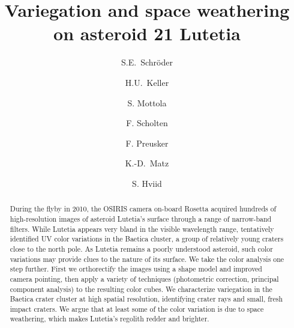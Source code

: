 \documentclass[3p,authoryear]{elsarticle}
\begin{document}
\begin{frontmatter}



\title{Variegation and space weathering on asteroid 21 Lutetia}


\author[DLR]{S.E.~Schr\"oder}
\author[TUB]{H.U.~Keller}
\author[DLR]{S. Mottola}
\author[DLR]{F. Scholten}
\author[DLR]{F. Preusker}
\author[DLR]{K.-D.~Matz}
\author[DLR]{S. Hviid}


\address[DLR]{Deutsches Zentrum f\"ur Luft- und Raumfahrt (DLR), 12489 Berlin, Germany}
\address[TUB]{Institut f\"ur Geophysik und extraterrestrische Physik (IGEP), Technische Universit\"at Braunschweig, 38106 Braunschweig, Germany}


\begin{abstract}

During the flyby in 2010, the OSIRIS camera on-board Rosetta acquired hundreds of high-resolution images of asteroid Lutetia's surface through a range of narrow-band filters. While Lutetia appears very bland in the visible wavelength range, \citet{Mg12} tentatively identified UV color variations in the Baetica cluster, a group of relatively young craters close to the north pole. As Lutetia remains a poorly understood asteroid, such color variations may provide clues to the nature of its surface. We take the color analysis one step further. First we orthorectify the images using a shape model and improved camera pointing, then apply a variety of techniques (photometric correction, principal component analysis) to the resulting color cubes. We characterize variegation in the Baetica crater cluster at high spatial resolution, identifying crater rays and small, fresh impact craters. We argue that at least some of the color variation is due to space weathering, which makes Lutetia's regolith redder and brighter.


\end{abstract}
\end{frontmatter}
\end{document}
